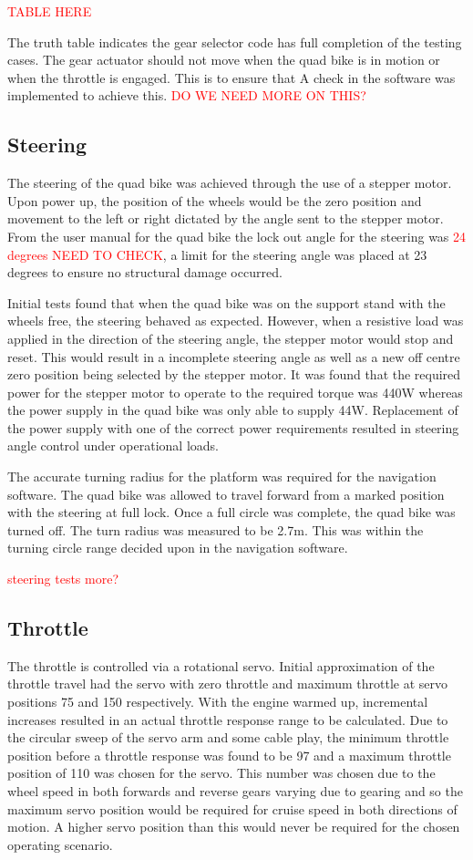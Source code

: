 \documentclass[main.tex]{subfiles}
\begin{document}
\textcolor{red}{TABLE HERE}

The truth table indicates the gear selector code has full completion of the testing cases. The gear actuator should not move when the quad bike is in motion or when the throttle is engaged. This is to ensure that   A check in the software was implemented to achieve this. \textcolor{red}{DO WE NEED MORE ON THIS?}

\subsection{Steering}
The steering of the quad bike was achieved through the use of a stepper motor. Upon power up, the position of the wheels would be the zero position and movement to the left or right dictated by the angle sent to the stepper motor. From the user manual for the quad bike the lock out angle for the steering was \textcolor{red}{24 degrees NEED TO CHECK}, a limit for the steering angle was placed at 23 degrees to ensure no structural damage occurred. 

Initial tests found that when the quad bike was on the support stand with the wheels free, the steering behaved as expected. However, when a resistive load was applied in the direction of the steering angle, the stepper motor would stop and reset. This would result in a incomplete steering angle as well as a new off centre zero position being selected by the stepper motor.  It was found that the required power for the stepper motor to operate to the required torque was 440W whereas the power supply in the quad bike was only able to supply 44W. Replacement of the power supply with one of the correct power requirements resulted in steering angle control under operational loads.

The accurate turning radius for the platform was required for the navigation software. The quad bike was allowed to travel forward from a marked position with the steering at full lock. Once a full circle was complete, the quad bike was turned off. The turn radius was measured to be 2.7m. This was within the turning circle range decided upon in the navigation software.

\textcolor{red}{steering tests more?}

\subsection{Throttle}
The throttle is controlled via a rotational servo. Initial approximation of the throttle travel had the servo with zero throttle and maximum throttle at servo positions 75 and 150 respectively. With the engine warmed up, incremental increases resulted in an actual throttle response range to be calculated. Due to the circular sweep of the servo arm and some cable play, the minimum throttle position before a throttle response was found to be 97 and a maximum throttle position of 110 was chosen for the servo. This number was chosen due to the wheel speed in both forwards and reverse gears varying due to gearing and so the maximum servo position would be required for cruise speed in both directions of motion. A higher servo position than this would never be required for the chosen operating scenario.
\end{document}
